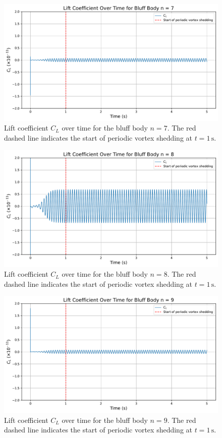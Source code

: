 \begin{figure}[H]
	\centering
	\includegraphics[width=\textwidth]{images/7face_graph}
	\caption{Lift coefficient $C_L$ over time for the bluff body $n=7$. The red dashed line indicates the start of periodic vortex shedding at $t = 1\,\mathrm{s}$.}
	\label{fig:7FaceGraph} 
\end{figure}

\begin{figure}[H]
	\centering
	\includegraphics[width=\textwidth]{images/8face_graph}
	\caption{Lift coefficient $C_L$ over time for the bluff body $n=8$. The red dashed line indicates the start of periodic vortex shedding at $t = 1\,\mathrm{s}$.}
	\label{fig:8FaceGraph} 
\end{figure}

\begin{figure}[H]
	\centering
	\includegraphics[width=\textwidth]{images/9face_graph}
	\caption{Lift coefficient $C_L$ over time for the bluff body $n=9$. The red dashed line indicates the start of periodic vortex shedding at $t = 1\,\mathrm{s}$.}
	\label{fig:9FaceGraph} 
\end{figure}

